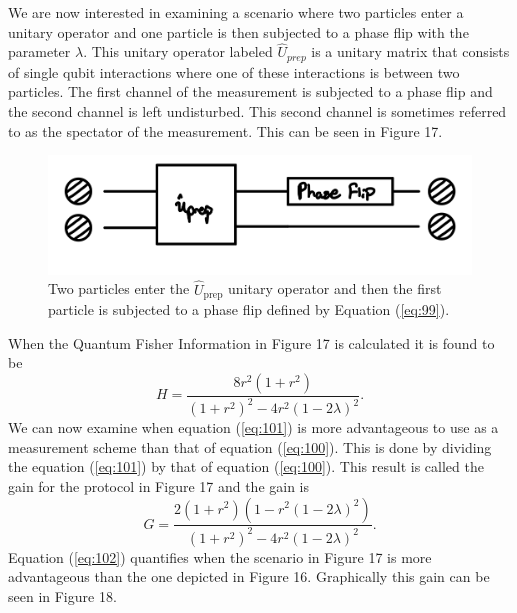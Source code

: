 \documentclass[twocolumn]{article}
\begin{document}
We are now interested in examining a scenario where two particles enter a unitary operator and one particle is then subjected to a phase flip with the parameter $\lambda$. This unitary operator labeled $\hat{U}_{prep}$ is a unitary matrix that consists of single qubit interactions where one of these interactions is between two particles. The first channel of the measurement is subjected to a phase flip and the second channel is left undisturbed. This second channel is sometimes referred to as the spectator of the measurement. This can be seen in Figure 17.
\begin{figure}[h]
\begin{center}
\includegraphics[width=0.65\linewidth]{Two-Particle-Phase-Flip-Single-Channel-Lambda-Schematic.jpeg}
\caption{Two particles enter the $\hat{U}_{\text{prep}}$ unitary operator and then the first particle is subjected to a phase flip defined by Equation (\ref{eq:99}).}
\end{center}
\end{figure}
\newline
When the Quantum Fisher Information in Figure 17 is calculated it is found to be
\begin{equation}\label{eq:101}
H=\frac{8r^2(1+r^2)}{(1+r^2)^2-4r^2(1-2\lambda)^2}.
\end{equation}
We can now examine when equation (\ref{eq:101}) is more advantageous to use as a measurement scheme than that of equation (\ref{eq:100}). This is done by dividing the equation (\ref{eq:101}) by that of equation (\ref{eq:100}). This result is called the gain for the protocol in Figure 17 and the gain is
\begin{equation}\label{eq:102}
G=\frac{2(1+r^2)(1-r^2(1-2\lambda)^2)}{(1+r^2)^2-4r^2(1-2\lambda)^2}.
\end{equation}
Equation (\ref{eq:102}) quantifies when the scenario in Figure 17 is more advantageous than the one depicted in Figure 16. Graphically this gain can be seen in Figure 18.
\end{document}
